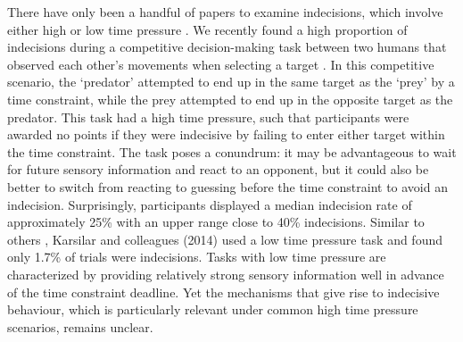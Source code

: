 \documentclass[12pt]{article}
\begin{document}
There have only been a handful of papers to examine indecisions, which involve either high \autocite{lokeshHumansUtilizeSensory2022} or low time pressure \autocite{karsilarSpeedAccuracyTradeoff2014, wuCapacityCognitiveControl2016,philiastidesCausalRoleDorsolateral2011, dambacherTimePressureAffects2015,forstmannStriatumPreSMAFacilitate2008}. We recently found a high proportion of indecisions during a competitive decision-making task between two humans that observed each other’s movements when selecting a target \autocite{lokeshHumansUtilizeSensory2022}. In this competitive scenario, the ‘predator’ attempted to end up in the same target as the ‘prey’ by a time constraint, while the prey attempted to end up in the opposite target as the predator. This task had a high time pressure, such that participants were awarded no points if they were indecisive by failing to enter either target within the time constraint. The task poses a conundrum: it may be advantageous to wait for future sensory information and react to an opponent, but it could also be better to switch from reacting to guessing before the time constraint to avoid an indecision. Surprisingly, participants displayed a median indecision rate of approximately 25\% with an upper range close to 40\% indecisions. Similar to others \autocite{karsilarSpeedAccuracyTradeoff2014, wuCapacityCognitiveControl2016, philiastidesCausalRoleDorsolateral2011, dambacherTimePressureAffects2015,forstmannStriatumPreSMAFacilitate2008}, Karsilar and colleagues (2014) used a low time pressure task and found only 1.7\% of trials were indecisions. Tasks with low time pressure are characterized by providing relatively strong sensory information well in advance of the time constraint deadline. Yet the mechanisms that give rise to indecisive behaviour, which is particularly relevant under common high time pressure scenarios, remains unclear. 
\end{document}
